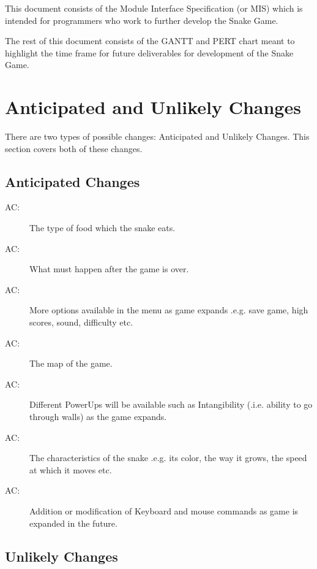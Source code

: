 \documentclass[12pt]{article}
\newcounter{acnum}
\newcommand{\actheacnum}{AC\theacnum}
\begin{document}
This document consists of the Module Interface Specification (or MIS) which is intended for programmers who work to further develop the Snake Game.

The rest of this document consists of the GANTT and PERT chart meant to highlight the time frame for future deliverables for development of the Snake Game.

\section{Anticipated and Unlikely Changes} \label{SecChange}

There are two types of possible changes: Anticipated and Unlikely Changes. This section covers both of these changes.

\subsection{Anticipated Changes} \label{SecAchange}



\begin{description}
\item[ \actheacnum \label{acFood}:] The type of food which the snake eats.
\item[ \actheacnum \label{acGameOver}:] What must happen after the game is over.
\item[ \actheacnum \label{acMainMenu}:] More options available in the menu as game expands .e.g. save game, high scores, sound, difficulty etc.
\item[ \actheacnum \label{acPlayMap}:] The map of the game.
\item[ \actheacnum \label{acPowerUps}:] Different PowerUps will be available such as Intangibility (.i.e. ability to go through walls) as the game expands.
\item[ \actheacnum \label{acSnake}:] The characteristics of the snake .e.g. its color, the way it grows, the speed at which it moves etc.
\item[ \actheacnum \label{acInput}:] Addition or modification of Keyboard and mouse commands as game is expanded in the future.
\end{description}

\subsection{Unlikely Changes} \label{SecUchange}
\end{document}

